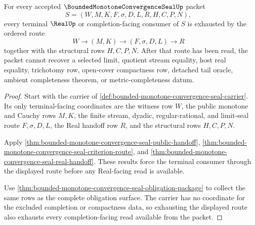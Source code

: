 \begin{theorem}
\label{thm:bounded-monotone-convergence-seal-terminal-budget-exhaustion}
For every accepted $\BoundedMonotoneConvergenceSealUp$ packet
$$
S=(W,M,K,F,\sigma,D,L,R,H,C,P,N),
$$
every terminal $\RealUp$ or completion-facing consumer of $S$ is exhausted by the ordered route
$$
W \to (M,K) \to (F,\sigma,D,L) \to R
$$
together with the structural rows $H,C,P,N$. After that route has been read, the packet cannot recover a selected limit, quotient stream equality, host real equality, trichotomy row, open-cover compactness row, detached tail oracle, ambient completeness theorem, or metric-completeness datum.
\end{theorem}
\begin{proof}
Start with the carrier of \autoref{def:bounded-monotone-convergence-seal-carrier}. Its only terminal-facing coordinates are the witness row $W$, the public monotone and Cauchy rows $M,K$, the finite stream, dyadic, regular-rational, and limit-seal route $F,\sigma,D,L$, the Real handoff row $R$, and the structural rows $H,C,P,N$.

Apply \autoref{thm:bounded-monotone-convergence-seal-public-handoff}, \autoref{thm:bounded-monotone-convergence-seal-criterion-route}, and \autoref{thm:bounded-monotone-convergence-seal-real-handoff}. These results force the terminal consumer through the displayed route before any Real-facing read is available.

Use \autoref{thm:bounded-monotone-convergence-seal-obligation-package} to collect the same rows as the complete obligation surface. The carrier has no coordinate for the excluded completion or compactness data, so exhausting the displayed route also exhausts every completion-facing read available from the packet.
\end{proof}

